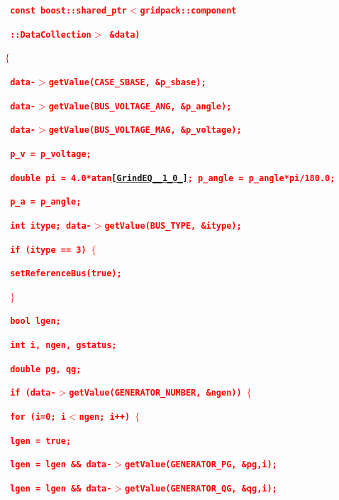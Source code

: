 \documentclass[12pt]{report} %
\begin{document}
\textcolor{red}{\texttt{\textbf{    const boost::shared\_ptr$\boldsymbol{\mathrm{<}}$gridpack::component}}}

\textcolor{red}{\texttt{\textbf{    ::DataCollection$\boldsymbol{\mathrm{>}}$ \&data)}}}

\textcolor{red}{\texttt{\textbf{$\boldsymbol{\mathrm{\{}}$}}}

\textcolor{red}{\texttt{\textbf{  data-$\boldsymbol{\mathrm{>}}$getValue(CASE\_SBASE, \&p\_sbase);}}}

\textcolor{red}{\texttt{\textbf{  data-$\boldsymbol{\mathrm{>}}$getValue(BUS\_VOLTAGE\_ANG, \&p\_angle);}}}

\textcolor{red}{\texttt{\textbf{  data-$\boldsymbol{\mathrm{>}}$getValue(BUS\_VOLTAGE\_MAG, \&p\_voltage);}}}

\textcolor{red}{\texttt{\textbf{  p\_v = p\_voltage;}}}

\textcolor{red}{\texttt{\textbf{  double pi = 4.0*atan\eqref{GrindEQ__1_0_}; p\_angle = p\_angle*pi/180.0;}}}

\textcolor{red}{\texttt{\textbf{  p\_a = p\_angle;}}}

\textcolor{red}{\texttt{\textbf{  int itype; data-$\boldsymbol{\mathrm{>}}$getValue(BUS\_TYPE, \&itype);}}}

\textcolor{red}{\texttt{\textbf{  if (itype == 3) $\boldsymbol{\mathrm{\{}}$}}}

\textcolor{red}{\texttt{\textbf{    setReferenceBus(true);}}}

\textcolor{red}{\texttt{\textbf{  $\boldsymbol{\mathrm{\}}}$}}}

\textcolor{red}{\texttt{\textbf{  bool lgen;}}}

\textcolor{red}{\texttt{\textbf{  int i, ngen, gstatus;}}}

\textcolor{red}{\texttt{\textbf{  double pg, qg;}}}

\textcolor{red}{\texttt{\textbf{  if (data-$\boldsymbol{\mathrm{>}}$getValue(GENERATOR\_NUMBER, \&ngen)) $\boldsymbol{\mathrm{\{}}$}}}

\textcolor{red}{\texttt{\textbf{    for (i=0; i$\boldsymbol{\mathrm{<}}$ngen; i++) $\boldsymbol{\mathrm{\{}}$}}}

\textcolor{red}{\texttt{\textbf{      lgen = true;}}}

\textcolor{red}{\texttt{\textbf{      lgen = lgen \&\& data-$\boldsymbol{\mathrm{>}}$getValue(GENERATOR\_PG, \&pg,i);}}}

\textcolor{red}{\texttt{\textbf{      lgen = lgen \&\& data-$\boldsymbol{\mathrm{>}}$getValue(GENERATOR\_QG, \&qg,i);}}}
\end{document}
